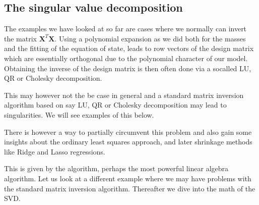 \documentclass[letterpaper,10pt,english]{sphinxmanual}
\begin{document}
\subsection{The singular value decomposition}
\label{\detokenize{chapter4:the-singular-value-decomposition}}
The examples we have looked at so far are cases where we normally can
invert the matrix \(\boldsymbol{X}^T\boldsymbol{X}\). Using a polynomial expansion as we
did both for the masses and the fitting of the equation of state,
leads to row vectors of the design matrix which are essentially
orthogonal due to the polynomial character of our model. Obtaining the inverse of the design matrix is then often done via a so\sphinxhyphen{}called LU, QR or Cholesky decomposition.

This may
however not the be case in general and a standard matrix inversion
algorithm based on say LU, QR or Cholesky decomposition may lead to singularities. We will see examples of this below.

There is however a way to partially circumvent this problem and also gain some insights about the ordinary least squares approach, and later shrinkage methods like Ridge and Lasso regressions.

This is given by the  algorithm, perhaps
the most powerful linear algebra algorithm.  Let us look at a
different example where we may have problems with the standard matrix
inversion algorithm. Thereafter we dive into the math of the SVD.
\end{document}
